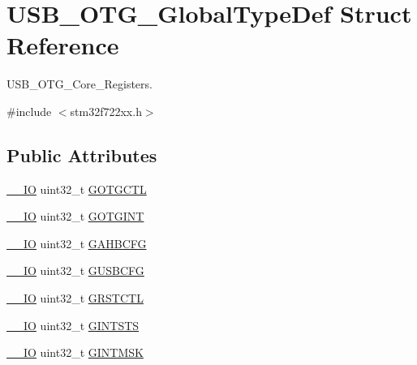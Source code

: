 \hypertarget{struct_u_s_b___o_t_g___global_type_def}{}\section{U\+S\+B\+\_\+\+O\+T\+G\+\_\+\+Global\+Type\+Def Struct Reference}
\label{struct_u_s_b___o_t_g___global_type_def}


U\+S\+B\+\_\+\+O\+T\+G\+\_\+\+Core\+\_\+\+Registers.  




{\ttfamily \#include $<$stm32f722xx.\+h$>$}

\subsection*{Public Attributes}
\begin{DoxyCompactItemize}
\item 
\mbox{\hyperlink{core__sc300_8h_aec43007d9998a0a0e01faede4133d6be}{\+\_\+\+\_\+\+IO}} uint32\+\_\+t \mbox{\hyperlink{struct_u_s_b___o_t_g___global_type_def_a44d3a8825526e6f362da26bbdfb9c71d}{G\+O\+T\+G\+C\+TL}}
\item 
\mbox{\hyperlink{core__sc300_8h_aec43007d9998a0a0e01faede4133d6be}{\+\_\+\+\_\+\+IO}} uint32\+\_\+t \mbox{\hyperlink{struct_u_s_b___o_t_g___global_type_def_a09055525656d2be5adce9471c2590c49}{G\+O\+T\+G\+I\+NT}}
\item 
\mbox{\hyperlink{core__sc300_8h_aec43007d9998a0a0e01faede4133d6be}{\+\_\+\+\_\+\+IO}} uint32\+\_\+t \mbox{\hyperlink{struct_u_s_b___o_t_g___global_type_def_a212059dc4a38136fee7fb358fc74c0d0}{G\+A\+H\+B\+C\+FG}}
\item 
\mbox{\hyperlink{core__sc300_8h_aec43007d9998a0a0e01faede4133d6be}{\+\_\+\+\_\+\+IO}} uint32\+\_\+t \mbox{\hyperlink{struct_u_s_b___o_t_g___global_type_def_a2094f12e3e4d4e6cc45047dedbfd0acd}{G\+U\+S\+B\+C\+FG}}
\item 
\mbox{\hyperlink{core__sc300_8h_aec43007d9998a0a0e01faede4133d6be}{\+\_\+\+\_\+\+IO}} uint32\+\_\+t \mbox{\hyperlink{struct_u_s_b___o_t_g___global_type_def_a75148d8257eaeec482aa99f8b4a8b0fb}{G\+R\+S\+T\+C\+TL}}
\item 
\mbox{\hyperlink{core__sc300_8h_aec43007d9998a0a0e01faede4133d6be}{\+\_\+\+\_\+\+IO}} uint32\+\_\+t \mbox{\hyperlink{struct_u_s_b___o_t_g___global_type_def_a0c0a00511f6c07b8609b54adb14319da}{G\+I\+N\+T\+S\+TS}}
\item 
\mbox{\hyperlink{core__sc300_8h_aec43007d9998a0a0e01faede4133d6be}{\+\_\+\+\_\+\+IO}} uint32\+\_\+t \mbox{\hyperlink{struct_u_s_b___o_t_g___global_type_def_a42668fa352b82eb13164a99664956271}{G\+I\+N\+T\+M\+SK}}

\end{DoxyCompactItemize}
